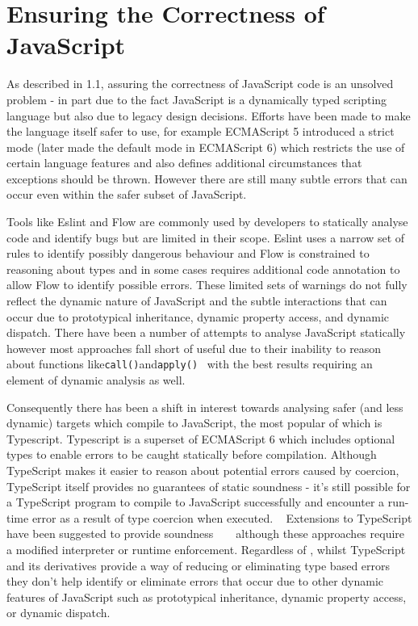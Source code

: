\documentclass[]{final_report}
\begin{document}
\section{Ensuring the Correctness of JavaScript}
As described in 1.1, assuring the correctness of JavaScript code is an unsolved problem - in part due to the fact JavaScript is a dynamically typed scripting language but also due to legacy design decisions. Efforts have been made to make the language itself safer to use, for example ECMAScript 5 introduced a strict mode (later made the default mode in ECMAScript 6) which restricts the use of certain language features and also defines additional circumstances that exceptions should be thrown. However there are still many subtle errors that can occur even within the safer subset of JavaScript.

Tools like Eslint and Flow are commonly used by developers to statically analyse code and identify bugs but are limited in their scope. Eslint uses a narrow set of rules to identify possibly dangerous behaviour and Flow is constrained to reasoning about types and in some cases requires additional code annotation to allow Flow to identify possible errors. These limited sets of warnings do not fully reflect the dynamic nature of JavaScript and the subtle interactions that can occur due to prototypical inheritance, dynamic property access, and dynamic dispatch. There have been a number of attempts to analyse JavaScript statically however most approaches fall short of useful due to their inability to reason about functions like\lstinline{call()}and\lstinline{apply()}~\cite{sridharan2012correlation} with the best results requiring an element of dynamic analysis as well. ~\cite{logozzo2010rata} ~\cite{wei2013practical}

Consequently there has been a shift in interest towards analysing safer (and less dynamic) targets which compile to JavaScript, the most popular of which is Typescript. Typescript is a superset of ECMAScript 6 which includes optional types to enable errors to be caught statically before compilation. Although TypeScript makes it easier to reason about potential errors caused by coercion, TypeScript itself provides no guarantees of static soundness - it's still possible for a TypeScript program to compile to JavaScript successfully and encounter a run-time error as a result of type coercion when executed. ~\cite{bierman2014understanding} Extensions to TypeScript have been suggested to provide soundness ~\cite{richards2015concrete} ~\cite{rastogi2015safe} although these approaches require a modified interpreter or runtime enforcement. Regardless of , whilst TypeScript and its derivatives provide a way of reducing or eliminating type based errors they don't help identify or eliminate errors that occur due to other dynamic features of JavaScript such as prototypical inheritance, dynamic property access, or dynamic dispatch.
\end{document}
